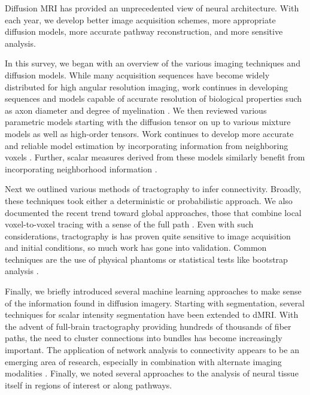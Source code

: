 \documentclass[final,hyperref]{gatech-thesis}
\begin{document}
Diffusion MRI has provided an unprecedented view of neural architecture.  With
each year, we develop better image acquisition schemes, more appropriate
diffusion models, more accurate pathway reconstruction, and more sensitive
analysis.

In this survey, we began with an overview of the various imaging techniques
and diffusion models.  While many acquisition sequences have become widely
distributed for high angular resolution imaging, work continues in developing
sequences and models capable of accurate resolution of biological properties
such as axon diameter and degree of myelination
\cite{Assaf2008,Alexander2009}.  We then reviewed various parametric models
starting with the diffusion tensor on up to various mixture models as well as
high-order tensors.  Work continues to develop more accurate and reliable
model estimation by incorporating information from neighboring voxels
\cite{Savadjiev2008,malcolm2009ipmi}.  Further, scalar measures derived from
these models similarly benefit from incorporating neighborhood information
\cite{Savadjiev2009}.

Next we outlined various methods of tractography to infer connectivity.
Broadly, these techniques took either a deterministic or probabilistic
approach.  We also documented the recent trend toward global approaches, those
that combine local voxel-to-voxel tracing with a sense of the full path
\cite{Fillard2009,Reisert2009}.  Even with such considerations, tractography
is has proven quite sensitive to image acquisition and initial conditions, so
much work has gone into validation.  Common techniques are the use of physical
phantoms \cite{Poupon2008phantom} or statistical tests like bootstrap analysis
\cite{Lazar2005,Jones2005,Clayden2007}.

Finally, we briefly introduced several machine learning approaches to make
sense of the information found in diffusion imagery.  Starting with
segmentation, several techniques for scalar intensity segmentation have been
extended to dMRI.  With the advent of full-brain tractography providing
hundreds of thousands of fiber paths, the need to cluster connections into
bundles has become increasingly important.  The application of network
analysis to connectivity appears to be an emerging area of research,
especially in combination with alternate imaging modalities
\cite{Bullmore2009}.  Finally, we noted several approaches to the analysis of
neural tissue itself in regions of interest or along pathways.
\end{document}
